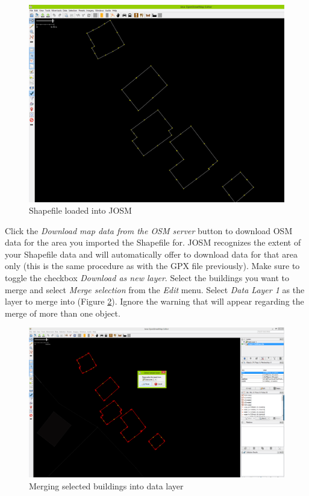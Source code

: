 \documentclass[a4paper,12pt,titlepage]{article}
\begin{document}
\begin{figure}[H]
	\centering
	\includegraphics[width=12cm]{Images/josm_shape_1.png}
	\caption{Shapefile loaded into JOSM}\label{fig:josm_shape_1}
\end{figure}

Click the \textit{Download map data from the OSM server} button to download OSM data for the area you imported the Shapefile for. JOSM recognizes the extent of your Shapefile data and will automatically offer to download data for that area only (this is the same procedure as with the GPX file previously). Make sure to toggle the checkbox \textit{Download as new layer}. Select the buildings you want to merge and select \textit{Merge selection} from the \textit{Edit} menu. Select \textit{Data Layer 1} as the layer to merge into  (Figure \ref{fig:josm_shape_2}). Ignore the warning that will appear regarding the merge of more than one object.

\begin{figure}[H]
	\centering
	\includegraphics[width=12cm]{Images/josm_shape_2.png}
	\caption{Merging selected buildings into data layer}\label{fig:josm_shape_2}
\end{figure}
\end{document}

